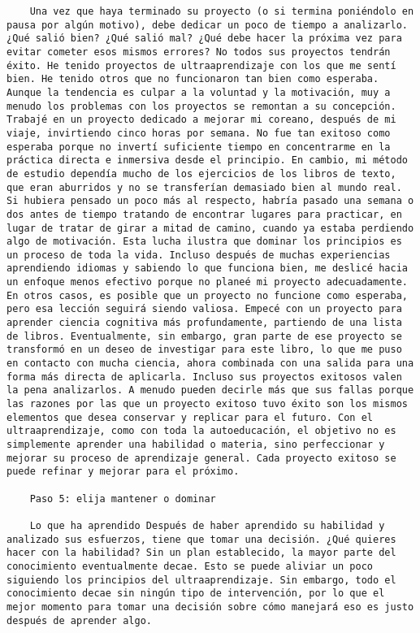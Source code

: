 \begin{verbatim}
	Una vez que haya terminado su proyecto (o si termina poniéndolo en pausa por algún motivo), debe dedicar un poco de tiempo a analizarlo. ¿Qué salió bien? ¿Qué salió mal? ¿Qué debe hacer la próxima vez para evitar cometer esos mismos errores? No todos sus proyectos tendrán éxito. He tenido proyectos de ultraaprendizaje con los que me sentí bien. He tenido otros que no funcionaron tan bien como esperaba. Aunque la tendencia es culpar a la voluntad y la motivación, muy a menudo los problemas con los proyectos se remontan a su concepción. Trabajé en un proyecto dedicado a mejorar mi coreano, después de mi viaje, invirtiendo cinco horas por semana. No fue tan exitoso como esperaba porque no invertí suficiente tiempo en concentrarme en la práctica directa e inmersiva desde el principio. En cambio, mi método de estudio dependía mucho de los ejercicios de los libros de texto, que eran aburridos y no se transferían demasiado bien al mundo real. Si hubiera pensado un poco más al respecto, habría pasado una semana o dos antes de tiempo tratando de encontrar lugares para practicar, en lugar de tratar de girar a mitad de camino, cuando ya estaba perdiendo algo de motivación. Esta lucha ilustra que dominar los principios es un proceso de toda la vida. Incluso después de muchas experiencias aprendiendo idiomas y sabiendo lo que funciona bien, me deslicé hacia un enfoque menos efectivo porque no planeé mi proyecto adecuadamente. En otros casos, es posible que un proyecto no funcione como esperaba, pero esa lección seguirá siendo valiosa. Empecé con un proyecto para aprender ciencia cognitiva más profundamente, partiendo de una lista de libros. Eventualmente, sin embargo, gran parte de ese proyecto se transformó en un deseo de investigar para este libro, lo que me puso en contacto con mucha ciencia, ahora combinada con una salida para una forma más directa de aplicarla. Incluso sus proyectos exitosos valen la pena analizarlos. A menudo pueden decirle más que sus fallas porque las razones por las que un proyecto exitoso tuvo éxito son los mismos elementos que desea conservar y replicar para el futuro. Con el ultraaprendizaje, como con toda la autoeducación, el objetivo no es simplemente aprender una habilidad o materia, sino perfeccionar y mejorar su proceso de aprendizaje general. Cada proyecto exitoso se puede refinar y mejorar para el próximo.
	
	Paso 5: elija mantener o dominar
	
	Lo que ha aprendido Después de haber aprendido su habilidad y analizado sus esfuerzos, tiene que tomar una decisión. ¿Qué quieres hacer con la habilidad? Sin un plan establecido, la mayor parte del conocimiento eventualmente decae. Esto se puede aliviar un poco siguiendo los principios del ultraaprendizaje. Sin embargo, todo el conocimiento decae sin ningún tipo de intervención, por lo que el mejor momento para tomar una decisión sobre cómo manejará eso es justo después de aprender algo.
	

\end{verbatim}
